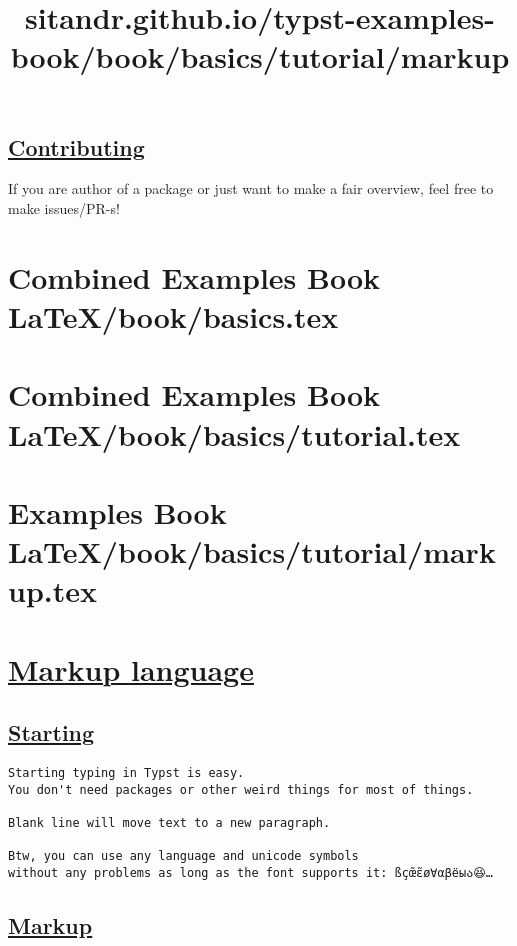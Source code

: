 \subsection{\texorpdfstring{\hyperref[contributing]{Contributing}}{Contributing}}\label{contributing}

If you are author of a package or just want to make a fair overview,
feel free to make issues/PR-s!




\section{Combined Examples Book LaTeX/book/basics.tex}
\section{Combined Examples Book LaTeX/book/basics/tutorial.tex}
\section{Examples Book LaTeX/book/basics/tutorial/markup.tex}
\title{sitandr.github.io/typst-examples-book/book/basics/tutorial/markup}

\section{\texorpdfstring{\hyperref[markup-language]{Markup
language}}{Markup language}}\label{markup-language}

\subsection{\texorpdfstring{\hyperref[starting]{Starting}}{Starting}}\label{starting}

\begin{verbatim}
Starting typing in Typst is easy.
You don't need packages or other weird things for most of things.

Blank line will move text to a new paragraph.

Btw, you can use any language and unicode symbols
without any problems as long as the font supports it: ßçœ̃ɛ̃ø∀αβёыა😆…
\end{verbatim}

\pandocbounded{}

\subsection{\texorpdfstring{\hyperref[markup]{Markup}}{Markup}}\label{markup}

